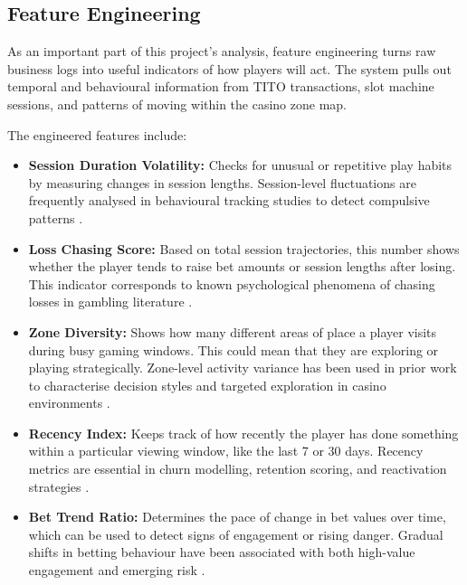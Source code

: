 \documentclass[12pt,a4paper]{report}
\begin{document}
\subsection{Feature Engineering}

As an important part of this project's analysis, feature engineering turns raw business logs into useful indicators of how players will act.  The system pulls out temporal and behavioural information from TITO transactions, slot machine sessions, and patterns of moving within the casino zone map.

The engineered features include:

\begin{itemize}

  \item \textbf{Session Duration Volatility:} Checks for unusual or repetitive play habits by measuring changes in session lengths. Session-level fluctuations are frequently analysed in behavioural tracking studies to detect compulsive patterns \citep{Abarbanel2022, Hing2014}.

  \item \textbf{Loss Chasing Score:} Based on total session trajectories, this number shows whether the player tends to raise bet amounts or session lengths after losing. This indicator corresponds to known psychological phenomena of chasing losses in gambling literature \citep{Ladouceur2016, Hing2014}.

  \item \textbf{Zone Diversity:} Shows how many different areas of place a player visits during busy gaming windows. This could mean that they are exploring or playing strategically. Zone-level activity variance has been used in prior work to characterise decision styles and targeted exploration in casino environments \citep{Omike2022c}.

  \item \textbf{Recency Index:} Keeps track of how recently the player has done something within a particular viewing window, like the last 7 or 30 days. Recency metrics are essential in churn modelling, retention scoring, and reactivation strategies \citep{Desiata2024b}.

  \item \textbf{Bet Trend Ratio:} Determines the pace of change in bet values over time, which can be used to detect signs of engagement or rising danger. Gradual shifts in betting behaviour have been associated with both high-value engagement and emerging risk \citep{Omike2022b, Hing2014}.

\end{itemize}
\end{document}
